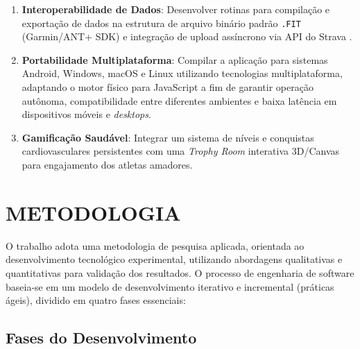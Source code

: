 \documentclass[
    a4paper,
    12pt,
    oneside,
    english,
    brazil,
    chapter=TITLE,
    section=TITLE,
]{abntex2}
\begin{document}
\begin{enumerate}
    \item \textbf{Interoperabilidade de Dados}: Desenvolver rotinas para compilação e exportação de dados na estrutura de arquivo binário padrão \texttt{.FIT} (Garmin/ANT+ SDK) \cite{garmin2024} e integração de upload assíncrono via API do Strava \cite{strava2025}.
    \item \textbf{Portabilidade Multiplataforma}: Compilar a aplicação para sistemas Android, Windows, macOS e Linux utilizando tecnologias multiplataforma, adaptando o motor físico para JavaScript a fim de garantir operação autônoma, compatibilidade entre diferentes ambientes e baixa latência em dispositivos móveis e \textit{desktops}.
    \item \textbf{Gamificação Saudável}: Integrar um sistema de níveis e conquistas cardiovasculares persistentes com uma \textit{Trophy Room} interativa 3D/Canvas para engajamento dos atletas amadores.
\end{enumerate}

\chapter{METODOLOGIA}
\label{sec:metodologia}

O trabalho adota uma metodologia de pesquisa aplicada, orientada ao desenvolvimento tecnológico experimental, utilizando abordagens qualitativas e quantitativas para validação dos resultados. O processo de engenharia de software baseia-se em um modelo de desenvolvimento iterativo e incremental (práticas ágeis), dividido em quatro fases essenciais:

\section{Fases do Desenvolvimento}
\label{sec:fases}
\end{document}
